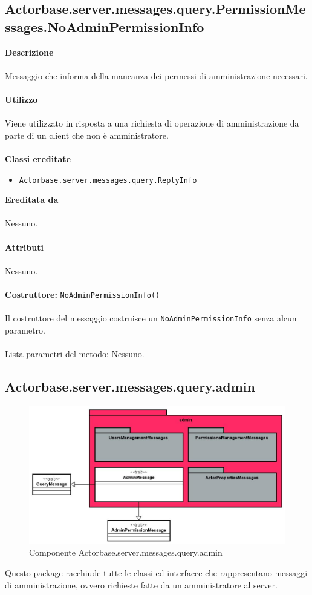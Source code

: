 \documentclass[a4paper]{article}
\begin{document}
\subsection{Actorbase.server.messages.query.PermissionMessages.NoAdminPermissionInfo}
		\textbf{Descrizione}
			\\ \\
			Messaggio che informa della mancanza dei permessi di amministrazione necessari.
			\\ \\
		\textbf{Utilizzo}
			\\ \\
			Viene utilizzato in risposta a una richiesta di operazione di amministrazione da parte di un client che non è amministratore.
			\\ \\
		\textbf{Classi ereditate}
			\begin{itemize}
				\item \texttt{Actorbase.server.messages.query.ReplyInfo}
			\end{itemize}
		\textbf{Ereditata da}
			\\ \\
			Nessuno.
			\\ \\
		\textbf{Attributi}
			\\ \\
			Nessuno.
			\\ \\
		\textbf{Costruttore: } \texttt{NoAdminPermissionInfo()}
			\\ \\
			Il costruttore del messaggio costruisce un \texttt{NoAdminPermissionInfo} senza alcun parametro.
			\\ \\
			Lista parametri del metodo: Nessuno.
			
		\subsection{Actorbase.server.messages.query.admin}
		\begin{figure}[H]
			\centering
			\includegraphics[width=\textwidth]{Server/adminLevel.jpg}
			\caption{Componente Actorbase.server.messages.query.admin}
		\end{figure}
		Questo package racchiude tutte le classi ed interfacce che rappresentano messaggi di amministrazione, ovvero richieste fatte da un amministratore al server.
		
\end{document}
